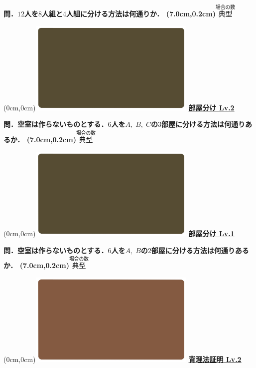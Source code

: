 \documentclass[10pt,
fleqn,
dvipdfmx,
uplatex
]{jsarticle}
\begin{document}
\LARGE 
\bf\boldmath 問．${12}$人を$8$人組と$4$人組に分ける方法は何通りか．
\at(7.0cm,0.2cm){\small\color{bradorange}$\overset{\text{場合の数}}{\text{典型}}$}


\newpage



\at(0cm,0cm){\includegraphics[width=8cm,bb=0 0 1920 1080]{./youtube/thumbnails/templates/smart_background/場合の数.jpeg}}
{\color{orange}\bf\boldmath\huge\underline{部屋分け Lv.2 }}\vspace{0.3zw}

\LARGE 
\bf\boldmath 問．空室は作らないものとする．$6$人を$A,\;B,\;C$の$3$部屋に分ける方法は何通りあるか．
\at(7.0cm,0.2cm){\small\color{bradorange}$\overset{\text{場合の数}}{\text{典型}}$}


\newpage



\at(0cm,0cm){\includegraphics[width=8cm,bb=0 0 1920 1080]{./youtube/thumbnails/templates/smart_background/場合の数.jpeg}}
{\color{orange}\bf\boldmath\huge\underline{部屋分け Lv.1 }}\vspace{0.3zw}

\LARGE 
\bf\boldmath 問．空室は作らないものとする．$6$人を$A,\;B$の$2$部屋に分ける方法は何通りあるか．
\at(7.0cm,0.2cm){\small\color{bradorange}$\overset{\text{場合の数}}{\text{典型}}$}


\newpage



\at(0cm,0cm){\includegraphics[width=8cm,bb=0 0 1920 1080]{./youtube/thumbnails/templates/smart_background/集合と命題.jpeg}}
{\color{orange}\bf\boldmath\LARGE\underline{背理法証明 Lv.2 }}\vspace{0.3zw}
\end{document}
